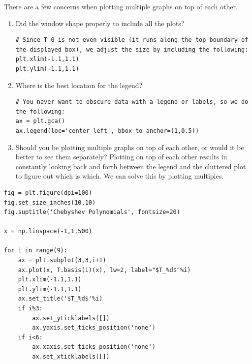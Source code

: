 There are a few concerns when plotting multiple graphs on top of each other.
\begin{enumerate}
\item Did the window shape properly to include all the plots?
\begin{lstlisting}
# Since T_0 is not even visible (it runs along the top boundary of the displayed box), we adjust the size by including the following:
plt.xlim(-1.1,1.1)
plt.ylim(-1.1,1.1)

\end{lstlisting}
\item Where is the best location for the legend?
\begin{lstlisting}
# You never want to obscure data with a legend or labels, so we do the following:
ax = plt.gca()
ax.legend(loc='center left', bbox_to_anchor=(1,0.5))
\end{lstlisting}
\item Should you be plotting multiple graphs on top of each other, or would it be better to see them separately? Plotting on top of each other results in constantly looking back and forth between the legend and the cluttered plot to figure out which is which. We can solve this by plotting multiples.

\end{enumerate}

\begin{lstlisting}
fig = plt.figure(dpi=100)
fig.set_size_inches(10,10)
fig.suptitle('Chebyshev Polynomials', fontsize=20)

x = np.linspace(-1,1,500)

for i in range(9):
    ax = plt.subplot(3,3,i+1)
    ax.plot(x, T.basis(i)(x), lw=2, label="$T_%d$"%i)
    plt.xlim(-1.1,1.1)
    plt.ylim(-1.1,1.1)
    ax.set_title('$T_%d$'%i)
    if i%3:
        ax.set_yticklabels([])
        ax.yaxis.set_ticks_position('none')
    if i<6:
        ax.xaxis.set_ticks_position('none')
        ax.set_xticklabels([])
\end{lstlisting}


